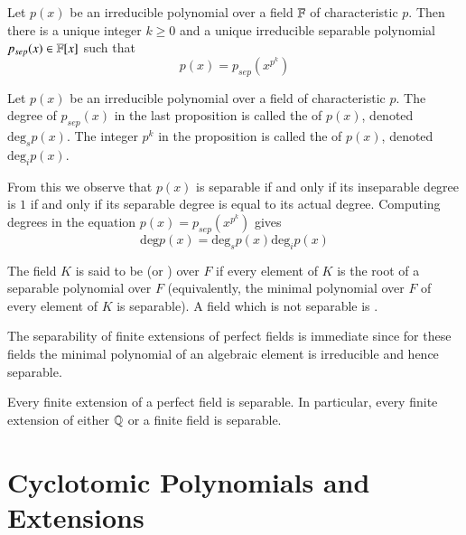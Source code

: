 \begin{proposition}
    Let $p(x)$ be an irreducible polynomial over a field $\mathbb F$ of characteristic $p$. Then there is a unique integer $k\geq 0$ and a unique irreducible separable polynomial $p_{sep}(x) \in \mathbb F[x]$ such that \begin{equation*}
        p(x) = p_{sep}(x^{p^k})
    \end{equation*}
\end{proposition}


\begin{definition}
    Let $p(x)$ be an irreducible polynomial over a field of characteristic $p$. The degree of $p_{sep}(x)$ in the last proposition is called the  of $p(x)$, denoted $\text{deg}_sp(x)$. The integer $p^k$ in the proposition is called the  of $p(x)$, denoted $\text{deg}_ip(x)$.
\end{definition}

From this we observe that $p(x)$ is separable if and only if its inseparable degree is $1$ if and only if its separable degree is equal to its actual degree. Computing degrees in the equation $p(x) = p_{sep}(x^{p^k})$ gives \begin{equation*}
    \text{deg}p(x) = \text{deg}_sp(x)\text{deg}_ip(x)
\end{equation*}


\begin{definition}
    The field $K$ is said to be  (or ) over $F$ if every element of $K$ is the root of a separable polynomial over $F$ (equivalently, the minimal polynomial over $F$ of every element of $K$ is separable). A field which is not separable is .
\end{definition}

The separability of finite extensions of perfect fields is immediate since for these fields the minimal polynomial of an algebraic element is irreducible and hence separable.

\begin{corollary}
    Every finite extension of a perfect field is separable. In particular, every finite extension of either $\mathbb Q$ or a finite field is separable.
\end{corollary}



\section{Cyclotomic Polynomials and Extensions}


